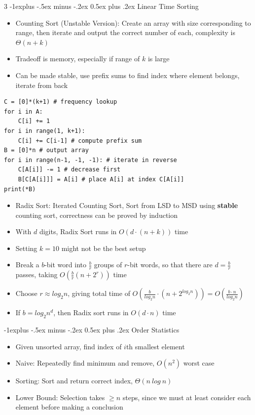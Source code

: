 \documentclass[10pt, landscape]{article}
\makeatletter
\renewcommand{\section}{\@startsection{section}{1}{0mm}%
                                {-1ex plus -.5ex minus -.2ex}%
                                {0.5ex plus .2ex}%
                                {\normalfont\large\bfseries}}
\renewcommand{\section}{\@startsection{section}{2}{0mm}%
                                {-1explus -.5ex minus -.2ex}%
                                {0.5ex plus .2ex}%
                                {\normalfont\normalsize\bfseries}}
\makeatother
\begin{document}
\begin{multicols*}{3}
\section{Linear Time Sorting}
\begin{itemize}
    \item Counting Sort (Unstable Version): Create an array with size corresponding to range, then iterate and output the correct number of each, complexity is $\Theta(n+k)$
    \item Tradeoff is memory, especially if range of $k$ is large
    \item Can be made stable, use prefix sums to find index where element belongs, iterate from back
\end{itemize}
\begin{verbatim}
C = [0]*(k+1) # frequency lookup
for i in A:
    C[i] += 1
for i in range(1, k+1):
    C[i] += C[i-1] # compute prefix sum
B = [0]*n # output array
for i in range(n-1, -1, -1): # iterate in reverse
    C[A[i]] -= 1 # decrease first
    B[C[A[i]]] = A[i] # place A[i] at index C[A[i]]
print(*B)
\end{verbatim}
\begin{itemize}
    \item Radix Sort: Iterated Counting Sort, Sort from LSD to MSD using \textbf{stable} counting sort, correctness can be proved by induction
    \item With $d$ digits, Radix Sort runs in $O(d \cdot (n+k))$ time
    \item Setting $k=10$ might not be the best setup
    \item Break a $b$-bit word into $\frac{b}{r}$ groups of $r$-bit words, so that there are $d=\frac{b}{r}$ passes, taking $O(\frac{b}{r}(n+2^r))$ time
    \item Choose $r \approx log_2n$, giving total time of $O(\frac{b}{log_2n}\cdot(n+2^{log_2n}))=O(\frac{b \cdot n}{log_2n})$
    \item If $b= log_2n^d$, then Radix sort runs in $O(d \cdot n)$ time
\end{itemize}

\section{Order Statistics}
\begin{itemize}
    \item Given unsorted array, find index of $i$th smallest element
    \item Naive: Repeatedly find minimum and remove, $O(n^2)$ worst case
    \item Sorting: Sort and return correct index, $\Theta(n\ log \ n)$
    \item Lower Bound: Selection takes $\geq n$ steps, since we must at least consider each element before making a conclusion
\end{itemize}


\end{multicols*}
\end{document}

